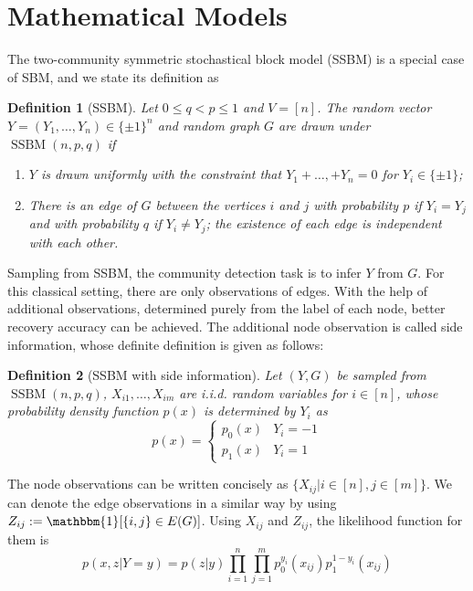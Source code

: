 \documentclass[conference]{IEEEtran}
\newtheorem{definition}{Definition}
\DeclareMathOperator{\SSBM}{SSBM}
\begin{document}
\section{Mathematical Models}
The two-community symmetric stochastical block model (SSBM) is a special case of SBM, and we state
its definition as
\begin{definition}[SSBM]
	Let $0\leq q<p\leq 1$ and $V=[n]$. The random vector $Y=(Y_1,\dots,Y_n)\in \{\pm 1\}^n$ and random graph $G$ are drawn under $\SSBM(n,p,q)$ if
	\begin{enumerate}
		\item $Y$ is drawn uniformly with the constraint that $Y_1 + \dots, + Y_n = 0$ for $Y_i \in \{\pm 1 \}$;
		
		\item There is an edge of $G$ between the vertices $i$ and $j$ with probability $p$ if $Y_i=Y_j$ and with probability $q$ if $Y_i \neq Y_j$; the existence of each edge is independent with each other.
	\end{enumerate}
\end{definition}
Sampling from SSBM, the community detection task is to infer $Y$ from $G$.
For this classical setting, there are only observations of edges. With the help of
additional observations, determined purely from the label of each node, better recovery
accuracy can be achieved. The additional node observation is called side information, whose
definite definition is given as follows:
\begin{definition}[SSBM with side information]
	Let $(Y,G)$ be sampled from $\SSBM(n,p,q)$, $X_{i1}, \dots, X_{im}$ are i.i.d. random variables for $i \in [n]$,
	whose probability density function $p(x)$ is determined by $Y_i$ as
	\begin{equation}
	p(x) = \begin{cases}
	p_0(x) & Y_i = -1 \\
	p_1(x) & Y_i = 1
	\end{cases}
	\end{equation}
\end{definition}
The node observations can be written concisely as $\{X_{ij} | i \in [n], j \in [m]\}$.
We can denote the edge observations in a similar way by using $Z_{ij}:=\mathbbm{1}[\{i,j\} \in E(G)]$.
Using $X_{ij}$ and $Z_{ij}$, the likelihood function for them is
\begin{equation}\label{eq:lh}
    p(x, z| Y=y) = p(z|y)\prod_{i=1}^n \prod_{j=1}^m p^{y_i}_0(x_{ij})p^{1-y_i}_1(x_{ij}) 
\end{equation}
\end{document}
